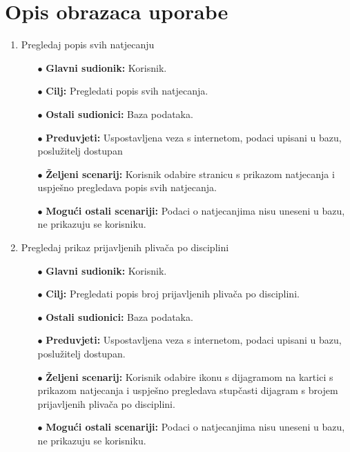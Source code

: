 \documentclass[times, utf8, zavrsni]{fer}
\begin{document}
\clearpage
\section{Opis obrazaca uporabe}

\begin{enumerate}
    \item Pregledaj popis svih natjecanju
    \begin{itemize}
        \item[$\bullet$] \textbf{Glavni sudionik:} Korisnik.
        \item[$\bullet$] \textbf{Cilj:} Pregledati popis svih natjecanja.
        \item[$\bullet$] \textbf{Ostali sudionici:} Baza podataka.
        \item[$\bullet$] \textbf{Preduvjeti:} Uspostavljena veza s internetom, podaci upisani u bazu, poslužitelj dostupan
        \item[$\bullet$] \textbf{Željeni scenarij:} Korisnik odabire stranicu s prikazom natjecanja i uspješno pregledava popis svih natjecanja.
        \item[$\bullet$] \textbf{Mogući ostali scenariji:} Podaci o natjecanjima nisu uneseni u bazu, ne prikazuju se korisniku.
    \end{itemize}



    \item Pregledaj prikaz prijavljenih plivača po disciplini 
    \begin{itemize}
        \item[$\bullet$] \textbf{Glavni sudionik:} Korisnik.
        \item[$\bullet$] \textbf{Cilj:} Pregledati popis broj prijavljenih plivača po disciplini.
        \item[$\bullet$] \textbf{Ostali sudionici:} Baza podataka.
        \item[$\bullet$] \textbf{Preduvjeti:} Uspostavljena veza s internetom, podaci upisani u bazu, poslužitelj dostupan.
        \item[$\bullet$] \textbf{Željeni scenarij:} Korisnik odabire ikonu s dijagramom na kartici s prikazom natjecanja i 
        uspješno pregledava stupčasti dijagram s brojem prijavljenih plivača po disciplini.
        \item[$\bullet$] \textbf{Mogući ostali scenariji:} Podaci o natjecanjima nisu uneseni u bazu, ne prikazuju se korisniku.
    \end{itemize}




\end{enumerate}
\end{document}

